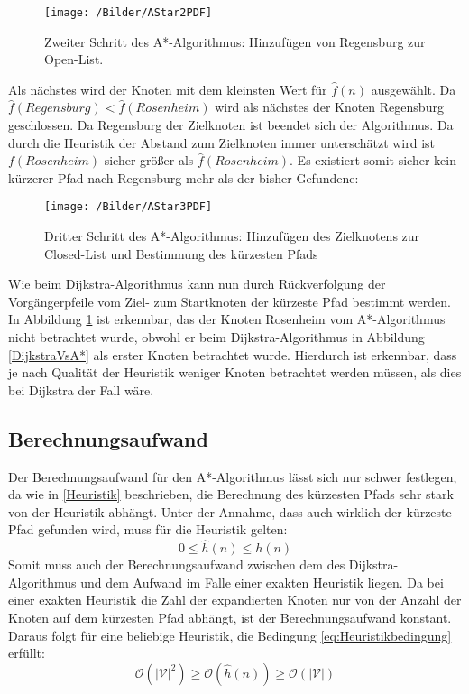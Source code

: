 		\begin{figure}[H]
			\centering
			\texttt{[image: /Bilder/AStar2PDF]}
			\vspace{0.2cm}
			\caption{Zweiter Schritt des A*-Algorithmus: Hinzufügen von Regensburg zur Open-List.}
		\end{figure}
		
		Als nächstes wird der Knoten mit dem kleinsten Wert  für $\hat{f}(n)$ ausgewählt. Da $\hat{f}(Regensburg)<\hat{f}(Rosenheim)$ wird als nächstes der Knoten Regensburg geschlossen. Da Regensburg der Zielknoten ist beendet sich der Algorithmus. Da durch die Heuristik der Abstand zum Zielknoten immer unterschätzt wird ist $f(Rosenheim)$ sicher größer als $\hat{f}(Rosenheim)$. Es existiert somit sicher kein kürzerer Pfad nach Regensburg mehr als der bisher Gefundene:

		\begin{figure}[H]
			\centering
			\texttt{[image: /Bilder/AStar3PDF]}
			\vspace{0.2cm}
			\caption{Dritter Schritt des A*-Algorithmus: Hinzufügen des Zielknotens zur Closed-List und Bestimmung des kürzesten Pfads} \label{A*3}
		\end{figure}
		
		Wie beim Dijkstra-Algorithmus kann nun durch Rückverfolgung der Vorgängerpfeile vom Ziel- zum Startknoten der kürzeste Pfad bestimmt werden. In Abbildung \ref{A*3} ist erkennbar, das der Knoten Rosenheim vom A*-Algorithmus nicht betrachtet wurde, obwohl er beim Dijkstra-Algorithmus in Abbildung \ref{DijkstraVsA*} als erster Knoten betrachtet wurde. Hierdurch ist erkennbar, dass je nach Qualität der Heuristik weniger Knoten betrachtet werden müssen, als dies bei Dijkstra der Fall wäre.
	
	\subsection{Berechnungsaufwand}
		\label{Aufwand_A*}
		Der Berechnungsaufwand für den A*-Algorithmus lässt sich nur schwer festlegen, da wie in \ref{Heuristik} beschrieben, die Berechnung des kürzesten Pfads sehr stark von der Heuristik abhängt. Unter der Annahme, dass auch wirklich der kürzeste Pfad gefunden wird, muss für die Heuristik gelten:
		\begin{equation} \label{eq:Heuristikbedingung}
			0\le \hat{h}(n)\le h(n)
		\end{equation}
		Somit muss auch der Berechnungsaufwand zwischen dem des Dijkstra-Algorithmus und dem Aufwand im Falle einer exakten Heuristik liegen. Da bei einer exakten Heuristik die Zahl der expandierten Knoten nur von der Anzahl der Knoten auf dem kürzesten Pfad abhängt, ist der Berechnungsaufwand konstant. Daraus folgt für eine beliebige Heuristik, die Bedingung \ref{eq:Heuristikbedingung} erfüllt:
		\begin{equation}
			\mathcal{O}(\lvert \mathcal{V}\rvert ^2)\ge \mathcal{O}(\hat{h}(n))\ge \mathcal{O}(\lvert \mathcal{V}\rvert)
		\end{equation}
		
